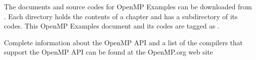 The documents and source codes for OpenMP Examples can be downloaded from
\href{\examplesrepo}{\examplesrepo}.
Each directory holds the contents of a chapter and has a  subdirectory of its codes. 
This OpenMP Examples \VER{} document and its codes are tagged as  .

Complete information about the OpenMP API and a list of the compilers that support
the OpenMP API can be found at the OpenMP.org web site


\clearpage




